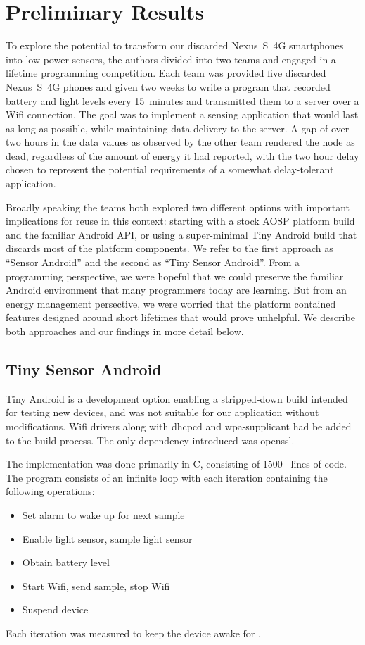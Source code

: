 \section{Preliminary Results}
\label{sec-results}

To explore the potential to transform our discarded Nexus~S~4G smartphones
into low-power sensors, the authors divided into two teams and engaged in a
lifetime programming competition. Each team was provided five discarded
Nexus~S~4G phones and given two weeks to write a program that recorded
battery and light levels every 15~minutes and transmitted them to a server
over a Wifi connection. The goal was to implement a sensing application that
would last as long as possible, while maintaining data delivery to the
server. A gap of over two hours in the data values as observed by the other
team rendered the node as dead, regardless of the amount of energy it had
reported, with the two hour delay chosen to represent the potential
requirements of a somewhat delay-tolerant application.


Broadly speaking the teams both explored two different options with important
implications for reuse in this context: starting with a stock AOSP platform
build and the familiar Android API, or using a super-minimal Tiny Android
build that discards most of the platform components. We refer to the first
approach as ``Sensor Android'' and the second as ``Tiny Sensor Android''.
From a programming perspective, we were hopeful that we could preserve the
familiar Android environment that many programmers today are learning. But
from an energy management persective, we were worried that the platform
contained features designed around short lifetimes that would prove
unhelpful. We describe both approaches and our findings in more detail
below.

\subsection{Tiny Sensor Android}

Tiny Android is a development option enabling a stripped-down build intended
for testing new devices, and was not suitable for our application without
modifications. Wifi drivers along with dhcpcd and wpa-supplicant had be added to
the build process. The only dependency introduced was openssl.

The implementation was done primarily in C, consisting of 1500~ lines-of-code.
The program consists of an infinite loop with each iteration containing the
following operations: 
\begin{itemize}
  \item Set alarm to wake up for next sample
  \item Enable light sensor, sample light sensor
  \item Obtain battery level
  \item Start Wifi, send sample, stop Wifi
  \item Suspend device
\end{itemize}
Each iteration was measured to keep the device awake for .

